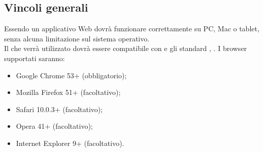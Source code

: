 \subsection{Vincoli generali}
Essendo un applicativo Web dovrà funzionare correttamente su PC, Mac o tablet, senza alcuna limitazione sul sistema operativo.\\
Il  che verrà utilizzato dovrà essere compatibile con  e gli standard , .
I browser supportati saranno: 
\begin{itemize}
	\item Google Chrome 53+ (obbligatorio);
	\item Mozilla Firefox 51+ (facoltativo);
	\item Safari 10.0.3+ (facoltativo);
	\item Opera 41+ (facoltativo);
	\item Internet Explorer 9+ (facoltativo).
\end{itemize}